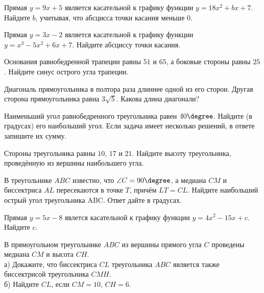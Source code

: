 \begin{homework}[number=2]
	\begin{listofex}
		\item Прямая \( y=9x+5 \) является касательной к графику функции \( y=18x^2+bx+7 \). Найдите \( b \), учитывая, что абсцисса точки касания меньше \( 0 \).
		\item Прямая \( y=3x-2 \) является касательной к графику функции \( y=x^3-5x^2+6x+7 \). Найдите абсциссу точки касания.
		\item Основания равнобедренной трапеции равны \( 51 \) и \( 65 \), а боковые стороны равны \( 25 \). Найдите синус острого угла трапеции.
		\item Диагональ прямоугольника в полтора раза длиннее одной из его сторон. Другая сторона прямоугольника равна \( 3\sqrt{5} \). Какова длина диагонали?
		\item Наименьший угол равнобедренного треугольника равен \( 40\degree \). Найдите (в градусах) его наибольший угол. Если задача
		имеет несколько решений, в ответе запишите их сумму.
		\item Стороны треугольника равны \( 10 \), \( 17 \) и \( 21 \). Найдите высоту треугольника, проведённую из вершины наибольшего угла.
		\item В треугольнике \( ABC \) известно, что \( \angle C = 90\degree \),
		а медиана \( CM \) и биссектриса \( AL \) пересекаются в точке \( T \), причём \( LT = CL \).
		Найдите наибольший острый угол треугольника ABC.
		Ответ дайте в градусах.
		\item Прямая \( y=5x-8 \) явлется касательной к графику функции \( y=4x^2-15x+c \). Найдите \( c \).
		\item В прямоугольном треугольнике \( ABC \) из вершины прямого
		угла \( C \) проведены медиана \( CM \) и высота \( CH \).\\
		а) Докажите, что биссектриса \( CL \) треугольника \( ABC \) является
		также биссектрисой треугольника \( CMH \).\\
		б) Найдите \( CL \), если \( CM = 10 \), \( CH = 6 \).
		\item {}
		\item {}
	\end{listofex}
\end{homework}

